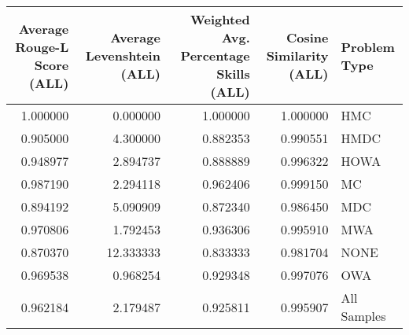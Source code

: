 \begin{tabular}{rrrrl}
\toprule
Average Rouge-L Score (ALL) & Average Levenshtein (ALL) & Weighted Avg. Percentage Skills (ALL) & Cosine Similarity (ALL) & Problem Type \\
\midrule
1.000000 & 0.000000 & 1.000000 & 1.000000 & HMC \\
0.905000 & 4.300000 & 0.882353 & 0.990551 & HMDC \\
0.948977 & 2.894737 & 0.888889 & 0.996322 & HOWA \\
0.987190 & 2.294118 & 0.962406 & 0.999150 & MC \\
0.894192 & 5.090909 & 0.872340 & 0.986450 & MDC \\
0.970806 & 1.792453 & 0.936306 & 0.995910 & MWA \\
0.870370 & 12.333333 & 0.833333 & 0.981704 & NONE \\
0.969538 & 0.968254 & 0.929348 & 0.997076 & OWA \\
0.962184 & 2.179487 & 0.925811 & 0.995907 & All Samples \\
\bottomrule
\end{tabular}
